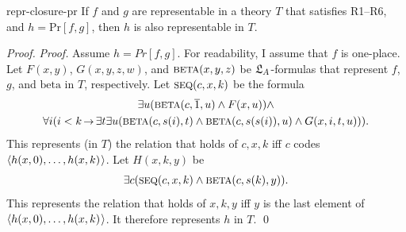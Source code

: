 \begin{lemma}{}{repr-closure-pr}
  If $f$ and $g$ are representable in a theory $T$ that satisfies R1--R6,
  and $h = \mathrm{Pr}[f,g]$,
  then $h$ is also representable in $T$.
\end{lemma}
\begin{proof}
  \emph{Proof.}
  Assume $h = Pr[f,g]$.
  For readability, I assume that $f$ is one-place.
  Let $F(x,y)$,
  $G(x,y,z,w)$,
  and $\smallcaps{Beta}(x,y,z)$
  be $\mathfrak{L}_A$-formulas that represent
  $f$, $g$, and $\mathrm{beta}$ in $T$,
  respectively.
  Let $\smallcaps{Seq}(c,x,k)$ be the formula
  \begin{multline*}
    \exists u (\smallcaps{Beta}(c,\num{1},u) \land F(x,u)) \land\\
    \forall i(i < k \to \exists t \exists u(
    \smallcaps{Beta}(c,s(i),t) \land \smallcaps{Beta}(c,s(s(i)),u) \land G(x,i,t,u))).
  \end{multline*}
  This represents (in $T$) the relation that
  holds of $c,x,k$ iff
  $c$ codes $\t{h(x,0), \ldots, h(x,k)}$.
  Let $H(x,k,y)$ be
  \[
    \exists c(\smallcaps{Seq}(c,x,k) \land \smallcaps{Beta}(c,s(k),y)).
  \]
  This represents the relation
  that holds of $x,k,y$ iff
  $y$ is the last element of $\t{h(x,0), \ldots, h(x,k)}$.
  It therefore represents $h$ in $T$. \qed

  
  
\end{proof}

